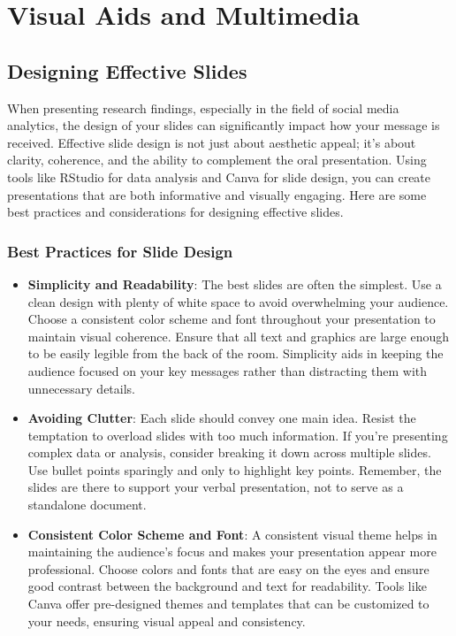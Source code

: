 \documentclass[
]{book}
\begin{document}
\hypertarget{visual-aids-and-multimedia}{%
\section*{Visual Aids and Multimedia}\label{visual-aids-and-multimedia}}

\hypertarget{designing-effective-slides}{%
\subsection*{Designing Effective Slides}\label{designing-effective-slides}}

When presenting research findings, especially in the field of social media analytics, the design of your slides can significantly impact how your message is received. Effective slide design is not just about aesthetic appeal; it's about clarity, coherence, and the ability to complement the oral presentation. Using tools like RStudio for data analysis and Canva for slide design, you can create presentations that are both informative and visually engaging. Here are some best practices and considerations for designing effective slides.

\hypertarget{best-practices-for-slide-design}{%
\subsubsection{Best Practices for Slide Design}\label{best-practices-for-slide-design}}

\begin{itemize}
\item
  \textbf{Simplicity and Readability}: The best slides are often the simplest. Use a clean design with plenty of white space to avoid overwhelming your audience. Choose a consistent color scheme and font throughout your presentation to maintain visual coherence. Ensure that all text and graphics are large enough to be easily legible from the back of the room. Simplicity aids in keeping the audience focused on your key messages rather than distracting them with unnecessary details.
\item
  \textbf{Avoiding Clutter}: Each slide should convey one main idea. Resist the temptation to overload slides with too much information. If you're presenting complex data or analysis, consider breaking it down across multiple slides. Use bullet points sparingly and only to highlight key points. Remember, the slides are there to support your verbal presentation, not to serve as a standalone document.
\item
  \textbf{Consistent Color Scheme and Font}: A consistent visual theme helps in maintaining the audience's focus and makes your presentation appear more professional. Choose colors and fonts that are easy on the eyes and ensure good contrast between the background and text for readability. Tools like Canva offer pre-designed themes and templates that can be customized to your needs, ensuring visual appeal and consistency.
\end{itemize}
\end{document}
